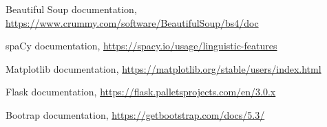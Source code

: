 \documentclass[11pt]{article}
\begin{document}
\begin{thebibliography}{}

Beautiful Soup documentation, \url{https://www.crummy.com/software/BeautifulSoup/bs4/doc}

spaCy documentation, \url{https://spacy.io/usage/linguistic-features}

Matplotlib documentation, \url{https://matplotlib.org/stable/users/index.html}

Flask documentation, \url{https://flask.palletsprojects.com/en/3.0.x}

Bootrap documentation, \url{https://getbootstrap.com/docs/5.3/}

\end{thebibliography}
\end{document}
